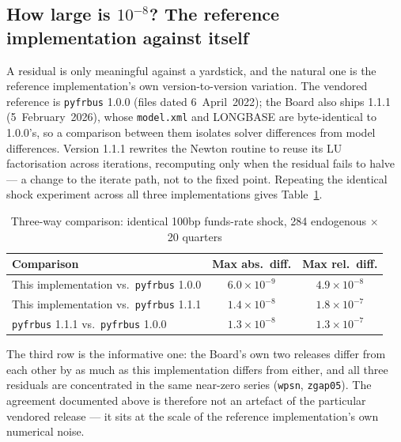 \subsection{How large is $10^{-8}$? The reference implementation against itself}
\label{subsec:refnoise}

A residual is only meaningful against a yardstick, and the natural one is the reference implementation's own version-to-version variation. The vendored reference is \texttt{pyfrbus} 1.0.0 (files dated 6~April~2022); the Board also ships 1.1.1 (5~February~2026), whose \texttt{model.xml} and LONGBASE are byte-identical to 1.0.0's, so a comparison between them isolates solver differences from model differences. Version 1.1.1 rewrites the Newton routine to reuse its LU factorisation across iterations, recomputing only when the residual fails to halve --- a change to the iterate path, not to the fixed point. Repeating the identical shock experiment across all three implementations gives Table~\ref{tab:refnoise}.

\begin{table}[htbp]
\centering
\caption{Three-way comparison: identical 100bp funds-rate shock, 284 endogenous $\times$ 20 quarters}
\label{tab:refnoise}
\begin{tabular}{lcc}
\toprule
Comparison & Max abs.\ diff. & Max rel.\ diff. \\
\midrule
This implementation vs.\ \texttt{pyfrbus} 1.0.0 & $6.0\times10^{-9}$ & $4.9\times10^{-8}$ \\
This implementation vs.\ \texttt{pyfrbus} 1.1.1 & $1.4\times10^{-8}$ & $1.8\times10^{-7}$ \\
\texttt{pyfrbus} 1.1.1 vs.\ \texttt{pyfrbus} 1.0.0 & $1.3\times10^{-8}$ & $1.3\times10^{-7}$ \\
\bottomrule
\end{tabular}
\end{table}

The third row is the informative one: the Board's own two releases differ from each other by as much as this implementation differs from either, and all three residuals are concentrated in the same near-zero series (\texttt{wpsn}, \texttt{zgap05}). The agreement documented above is therefore not an artefact of the particular vendored release --- it sits at the scale of the reference implementation's own numerical noise.

